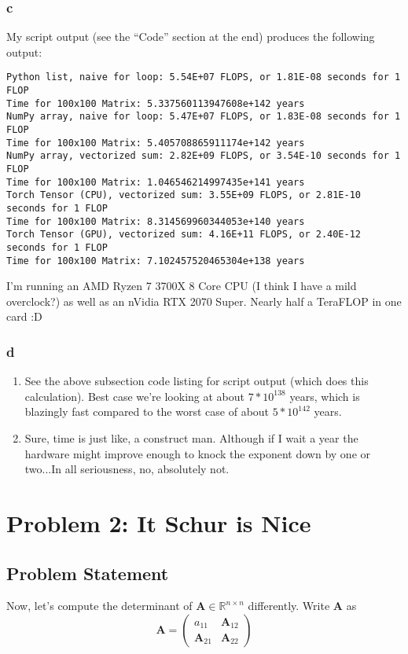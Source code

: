\documentclass[11pt]{report}
\theoremstyle{definition}
\newcommand{\mat}[1]{\mathbf{#1}}
\begin{document}
\subsubsection*{c}
My script output (see the ``Code'' section at the end) produces the following output:
\begin{lstlisting}[basicstyle=\small]
Python list, naive for loop: 5.54E+07 FLOPS, or 1.81E-08 seconds for 1 FLOP
Time for 100x100 Matrix: 5.337560113947608e+142 years
NumPy array, naive for loop: 5.47E+07 FLOPS, or 1.83E-08 seconds for 1 FLOP
Time for 100x100 Matrix: 5.405708865911174e+142 years
NumPy array, vectorized sum: 2.82E+09 FLOPS, or 3.54E-10 seconds for 1 FLOP
Time for 100x100 Matrix: 1.046546214997435e+141 years
Torch Tensor (CPU), vectorized sum: 3.55E+09 FLOPS, or 2.81E-10 seconds for 1 FLOP
Time for 100x100 Matrix: 8.314569960344053e+140 years
Torch Tensor (GPU), vectorized sum: 4.16E+11 FLOPS, or 2.40E-12 seconds for 1 FLOP
Time for 100x100 Matrix: 7.102457520465304e+138 years
\end{lstlisting}
I'm running an AMD Ryzen 7 3700X 8 Core CPU (I think I have a mild overclock?)
as well as an nVidia RTX 2070 Super. Nearly half a TeraFLOP in one card :D

\subsubsection*{d}
\begin{enumerate}
	\item See the above subsection code listing for script output (which does
	      this calculation). Best case we're looking at about $7*10^{138}$ years, which
	      is blazingly fast compared to the worst case of about $5*10^{142}$ years.
	\item Sure, time is just like, a construct man. Although if I wait a year
	      the hardware might improve enough to knock the exponent down by one or
	      two...In all seriousness, no, absolutely not.
\end{enumerate}



\newpage

\section*{Problem 2: It Schur is Nice}
\subsection*{Problem Statement}
Now, let's compute the determinant of $\mat{A}\in\mathbb{R}^{n\times n}$ differently.
Write $\mat{A}$ as
\begin{equation}
	\mat{A} = \begin{pmatrix}
		a_{11}       & \mat{A}_{12} \\
		\mat{A}_{21} & \mat{A}_{22}
	\end{pmatrix}
\end{equation}
\end{document}

